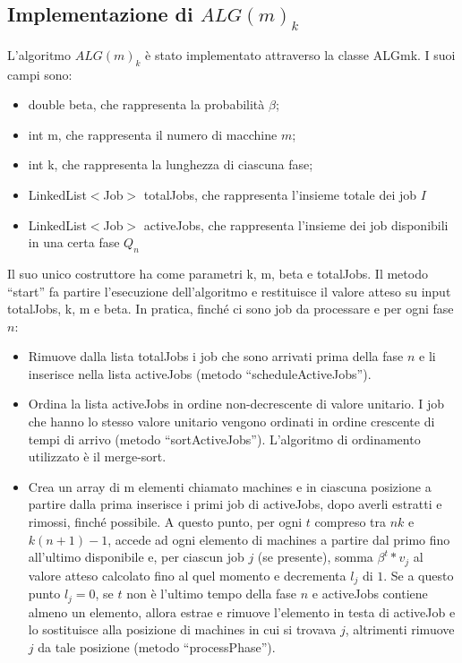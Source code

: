 \documentclass[12pt]{article}
\begin{document}
\subsection{Implementazione di $ALG(m)_{k}$}
L’algoritmo $ALG(m)_{k}$ è stato implementato attraverso la classe ALGmk. I suoi campi sono:
\begin{itemize}
\item{double beta, che rappresenta la probabilità $\beta$;}
\item{int m, che rappresenta il numero di macchine $m$;}
\item{int k, che rappresenta la lunghezza di ciascuna fase;}
\item{LinkedList$<$Job$>$ totalJobs, che rappresenta l’insieme totale dei job $I$}
\item{LinkedList$<$Job$>$ activeJobs, che rappresenta l’insieme dei job disponibili in una certa fase $Q_{n}$}
\end{itemize}
Il suo unico costruttore ha come parametri k, m, beta e totalJobs. Il metodo “start” fa partire l’esecuzione dell’algoritmo e restituisce il valore atteso su input totalJobs, k, m e beta. In pratica, finché ci sono job da processare e per ogni fase $n$:
\begin{itemize}
\item{Rimuove dalla lista totalJobs i job che sono arrivati prima della fase $n$ e li inserisce nella lista activeJobs (metodo “scheduleActiveJobs”).}
\item{Ordina la lista activeJobs in ordine non-decrescente di valore unitario. I job che hanno lo stesso valore unitario  vengono ordinati in ordine crescente di tempi di arrivo (metodo “sortActiveJobs”). L’algoritmo di ordinamento utilizzato è il merge-sort.}
\item{Crea un array di m elementi chiamato machines e in ciascuna posizione a partire dalla prima inserisce i primi job di activeJobs, dopo averli estratti e rimossi, finché possibile. A questo punto, per ogni $t$ compreso tra $nk$ e $k(n + 1) - 1$, accede ad ogni elemento di machines a partire dal primo fino all’ultimo disponibile e, per ciascun job $j$ (se presente), somma $\beta^{t} * v_{j}$ al valore atteso calcolato fino al quel momento e decrementa $l_{j}$ di $1$. Se a questo punto $l_{j} = 0$, se $t$ non è l’ultimo tempo della fase $n$ e activeJobs contiene almeno un elemento, allora estrae e rimuove l’elemento in testa di activeJob e lo sostituisce alla posizione di machines in cui si trovava $j$, altrimenti rimuove $j$ da tale posizione (metodo “processPhase”).}
\end{itemize}
\end{document}
